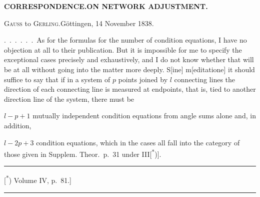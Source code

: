 \hfill\textbf{CORRESPONDENCE.\quad ON NETWORK ADJUSTMENT.}
\begin{center}\textsc{Gauss} to \textsc{Gerling}.\quad Göttingen, 14 November 1838.\end{center}

.\ .\ .\ .\ .\ .\ As for the formulas for the number of condition equations,
I have no objection at all to their publication. But it is impossible
for me  to specify the exceptional cases precisely and
exhaustively, and I do not know whether that will be 
at all without going into the matter more deeply. S[ine] m[editatione]
it should suffice to say that if in a system of $p$ points joined by $l$
connecting lines the direction of each connecting line is measured at
 endpoints, that is, tied to another direction line of
the system, there must be

$l-p+1$ mutually independent condition equations from angle sums alone
and, in addition,

$l-2p+3$  condition equations, which in the 
cases all fall into the category of those given in
Supplem. Theor.\ p.\ 31 under III[\textsuperscript{*})].
\par\medskip
\noindent\rule{.24\textwidth}{.4pt}\par\smallskip
{\footnotesize\noindent\hspace*{1.5em}[\textsuperscript{*}) Volume IV, p.\ 81.]\par}
\vspace{2em}
\begin{center}\rule{.18\textwidth}{.4pt}\end{center}
